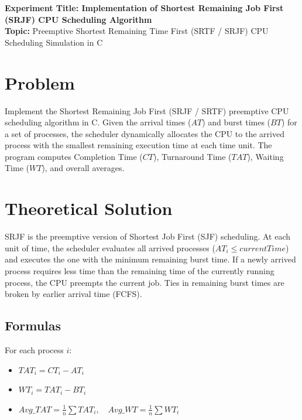 \documentclass[10pt,a4paper]{article}
\begin{document}
\raggedbottom
\thispagestyle{firstpage}

\begin{center}
  {\Large\bfseries\sffamily\color{primary} Experiment Title: Implementation of Shortest Remaining Job First (SRJF) CPU Scheduling Algorithm}\\[3pt]
  {\normalsize\sffamily\textbf{Topic:} Preemptive Shortest Remaining Time First (SRTF / SRJF) CPU Scheduling Simulation in C}
\end{center}
\vspace{-4pt}

\section{Problem}
Implement the Shortest Remaining Job First (SRJF / SRTF) preemptive CPU scheduling algorithm in C. Given the arrival times ($AT$) and burst times ($BT$) for a set of processes, the scheduler dynamically allocates the CPU to the arrived process with the smallest remaining execution time at each time unit. The program computes Completion Time ($CT$), Turnaround Time ($TAT$), Waiting Time ($WT$), and overall averages.

\section{Theoretical Solution}
SRJF is the preemptive version of Shortest Job First (SJF) scheduling. At each unit of time, the scheduler evaluates all arrived processes ($AT_i \le currentTime$) and executes the one with the minimum remaining burst time. If a newly arrived process requires less time than the remaining time of the currently running process, the CPU preempts the current job. Ties in remaining burst times are broken by earlier arrival time (FCFS).

\subsection{Formulas}
For each process $i$:
\begin{itemize}[noitemsep,topsep=1pt,leftmargin=1.2em]
  \item $TAT_i = CT_i - AT_i$
  \item $WT_i = TAT_i - BT_i$
  \item $Avg\_TAT = \frac{1}{n} \sum TAT_i, \quad Avg\_WT = \frac{1}{n} \sum WT_i$
\end{itemize}
\end{document}
